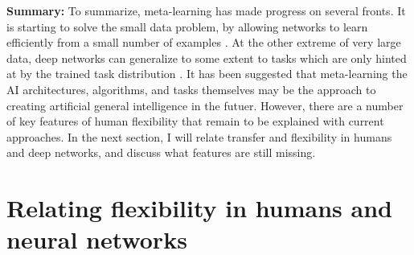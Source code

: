 \textbf{Summary:} To summarize, meta-learning has made progress on several fronts. It is starting to solve the small data problem, by allowing networks to learn efficiently from a small number of examples \citep[e.g.][]{Wang2016a}. At the other extreme of very large data, deep networks can generalize to some extent to tasks which are only hinted at by the trained task distribution \citep[e.g.][]{Radford2019}. It has been suggested that meta-learning the AI architectures, algorithms, and tasks themselves may be the approach to creating artificial general intelligence in the futuer. However, there are a number of key features of human flexibility that remain to be explained with current approaches. In the next section, I will relate transfer and flexibility in humans and deep networks, and discuss what features are still missing. \par 

\section{Relating flexibility in humans and neural networks}

